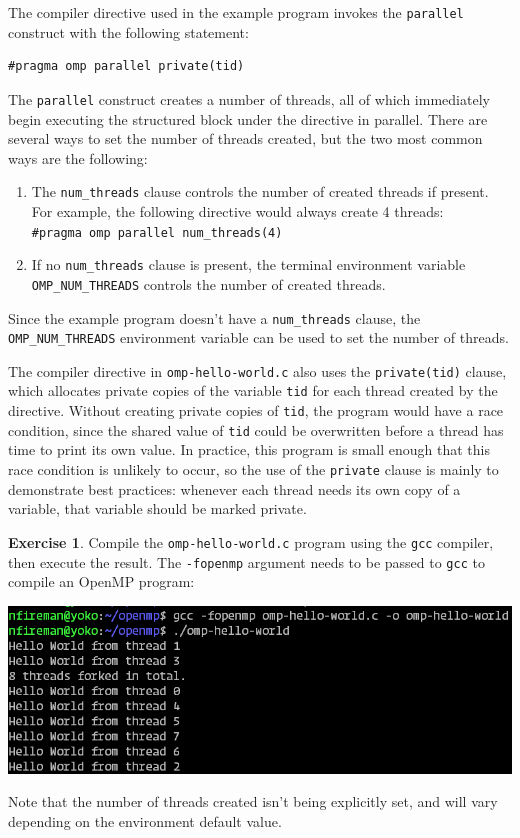 \documentclass{article}
\theoremstyle{definition}
\newtheorem{exercise}{Exercise}
\begin{document}
The compiler directive used in the example program invokes the \texttt{parallel} construct with the following statement:
\begin{verbatim}
#pragma omp parallel private(tid)
\end{verbatim}

The \texttt{parallel} construct creates a number of threads, all of which immediately begin executing the structured block under the directive in parallel. There are several ways to set the number of threads created, but the two most common ways are the following:

\begin{enumerate}
    \item The \texttt{num\_threads} clause controls the number of created threads if present. For example, the following directive would always create 4 threads:\\
    \texttt{\#pragma omp parallel num\_threads(4)}
    
    \item If no \texttt{num\_threads} clause is present, the terminal environment variable \texttt{OMP\_NUM\_THREADS} controls the number of created threads.
\end{enumerate}

Since the example program doesn't have a \texttt{num\_threads} clause, the \texttt{OMP\_NUM\_THREADS} environment variable can be used to set the number of threads.

The compiler directive in \texttt{omp-hello-world.c} also uses the \texttt{private(tid)} clause, which allocates private copies of the variable \texttt{tid} for each thread created by the directive. Without creating private copies of \texttt{tid}, the program would have a race condition, since the shared value of \texttt{tid} could be overwritten before a thread has time to print its own value. In practice, this program is small enough that this race condition is unlikely to occur, so the use of the \texttt{private} clause is mainly to demonstrate best practices: whenever each thread needs its own copy of a variable, that variable should be marked private.

\begin{exercise}
Compile the \texttt{omp-hello-world.c} program using the \texttt{gcc} compiler, then execute the result. The \texttt{-fopenmp} argument needs to be passed to \texttt{gcc} to compile an OpenMP program:

\includegraphics[width=\textwidth]{images/hello-world-output.png}

Note that the number of threads created isn't being explicitly set, and will vary depending on the environment default value.
\end{exercise}
\end{document}
